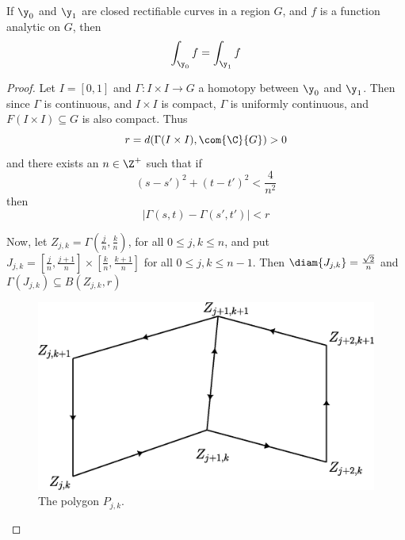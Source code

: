\begin{theorem}\label{4.6.3}
    If $\y_0$ and $\y_1$ are closed rectifiable curves in a region $G$, and $f$
    is a function analytic on $G$, then
    \begin{equation*}
    \int_{\y_0}{f}=\int_{\y_1}{f}
    \end{equation*}
\end{theorem}
\begin{proof}
    Let $I=[0,1]$ and $\Gamma:I \times I \xrightarrow{} G$ a homotopy between
    $\y_0$ and $\y_1$. Then since $\Gamma$ is continuous, and  $I \times I$ is
    compact,  $\Gamma$ is uniformly continuous, and  $F(I \times I) \subseteq G$
    is also compact. Thus
    \begin{equation*}
        r=d(\Gamma(I \times I), \com{\C}{G})>0
    \end{equation*}
    and there exists an $n \in \Z^+$ such that if
    \begin{equation*}
        (s-s')^2+(t-t')^2<\frac{4}{n^2}
    \end{equation*}
    then
    \begin{equation*}
        |\Gamma(s,t)-\Gamma(s',t')|<r
    \end{equation*}

    Now, let $Z_{j,k}=\Gamma(\frac{j}{n},\frac{k}{n})$, for all $0 \leq j,k \leq
    n$, and put  $J_{j,k}=[\frac{j}{n},\frac{j+1}{n}] \times
    [\frac{k}{n},\frac{k+1}{n}]$ for all $0 \leq j,k \leq n-1$. Then
    $\diam{J_{j,k}}=\frac{\sqrt{2}}{n}$  and $\Gamma(J_{j,k}) \subseteq
    B(Z_{j,k},r)$

    \begin{figure}[h]
        \centering
        \includegraphics[scale=0.5]{Figures/chapter4/cauchy_2.eps}
        \caption{The polygon $P_{j,k}$.}
        \label{figure_4.4}
    \end{figure}


\end{proof}
